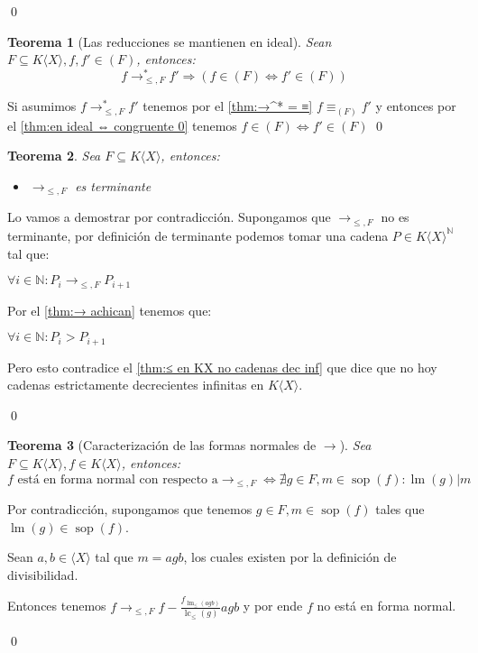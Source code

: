 \documentclass[12pt]{report}
\theoremstyle{customstyle}
\newtheorem{theorem}{Teorema}[chapter]
\renewenvironment{proof}[1][\proofname]{{\bfseries #1: }}{\qed} %
\theoremstyle{factstyle}
\DeclareMathOperator{\sop}{sop}
\DeclareMathOperator{\lm}{lm}
\DeclareMathOperator{\lc}{lc}
\begin{document}
\begin{proof}
\begin{description}
  \end{description}
\end{proof}

\begin{theorem}[Las reducciones se mantienen en ideal]\label{thm:→ mantiene pertenencia a ideal}
  Sean $F ⊆ K⟨X⟩, f, f' ∈ (F)$, entonces:
  \[ f →^*_{≤, F} f' ⇒ (f ∈ (F) ⇔ f' ∈ (F)) \]
\end{theorem}
\begin{proof}
  Si asumimos $f →^*_{≤, F} f'$ tenemos por el \cref{thm:→^* = ≡} $f ≡_{(F)} f'$ y entonces por el \cref{thm:en ideal ⇔ congruente 0} tenemos $f ∈ (F) ⇔ f' ∈ (F)$
\end{proof}

\begin{theorem}
  Sea $F ⊆ K⟨X⟩$, entonces:
  \begin{itemize}
    \item $→_{≤, F}$ es terminante
  \end{itemize}
\end{theorem}
\begin{proof}
  Lo vamos a demostrar por contradicción. Supongamos que $→_{≤, F}$ no es terminante, por definición de terminante podemos tomar una cadena $P ∈ K⟨X⟩^ℕ$ tal que:

  $∀i ∈ ℕ : P_i →_{≤, F} P_{i+1}$

  Por el \cref{thm:→ achican} tenemos que:

  $∀i ∈ ℕ : P_i > P_{i+1}$

  Pero esto contradice el \cref{thm:≤ en KX no cadenas dec inf} que dice que no hoy cadenas estrictamente decrecientes infinitas en $K⟨X⟩$.

\end{proof}

\begin{theorem}[Caracterización de las formas normales de $→$]
  Sea $F ⊆ K⟨X⟩, f ∈ K⟨X⟩$, entonces: %
  \[ f\text{ está en forma normal con respecto a} →_{≤, F} ⇔ ∄g ∈ F, m ∈ \sop(f) : \lm(g) | m \]
\end{theorem}
\begin{proof}
  Por contradicción, supongamos que tenemos $g ∈ F, m ∈ \sop(f)$ tales que $\lm(g) ∈ \sop(f)$.

  Sean $a, b ∈ ⟨X⟩$ tal que $m = agb$, los cuales existen por la definición de divisibilidad.

  Entonces tenemos $f →_{≤, F} f - \frac{f_{\lm_≤(agb)}}{\lc_≤(g)}agb$ y por ende $f$ no está en forma normal.

\end{proof}
\end{document}
